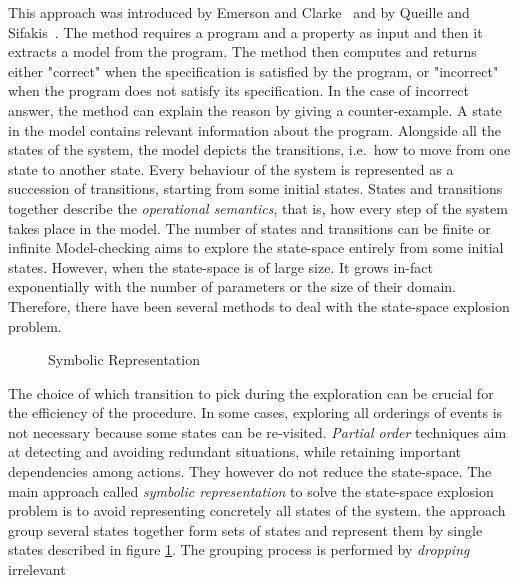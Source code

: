 This approach was introduced by Emerson and Clarke~\cite{CE82} and by
Queille and Sifakis~\cite{QS82}. The method requires a program and a property as input and then it extracts a model from the program. The method then computes and returns either "correct" when the specification
is satisfied by the program, or "incorrect" when the program does not satisfy its specification. In the case of incorrect answer, the method can explain the reason by giving a counter-example. A state in the model contains relevant information about the program. Alongside all the states of the system, the model depicts the
transitions, i.e.\ how to move from one state to another state. Every behaviour of the system is represented as a succession of
transitions, starting from some initial states. States and transitions together describe the \emph{operational
  semantics}, that is, how every step of the system takes place in the
model. The number of states and transitions can be finite or infinite Model-checking aims to explore the state-space entirely from some initial states. However, when the state-space is of large size. It grows in-fact
exponentially with the number of parameters or the size of their
domain. Therefore, there have been several methods to deal with the
state-space explosion problem.
\vspace{1cm}
\begin{figure}[h]
  \centering
  \vspace{0.3cm}
  \caption{Symbolic Representation}      
\label{symbolicabs}
\end{figure}
\vspace{1cm}
The choice of which transition to pick during the exploration can be
crucial for the efficiency of the procedure. In some cases, exploring all orderings of events is not necessary because some states can be re-visited. \emph{Partial order} techniques aim at detecting and avoiding
redundant situations, while retaining important dependencies among
actions. They however do not reduce the state-space. The main approach called \emph{symbolic
  representation}  to solve the state-space explosion problem is to avoid representing concretely all states of the system. the approach group several states together form sets of states and represent them by single states described in figure \ref{symbolicabs}. The grouping process is performed by \emph{dropping} irrelevant

